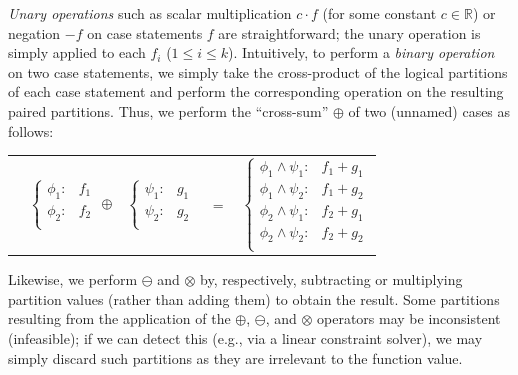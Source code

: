 \documentclass[letterpaper]{article}
\begin{document}
\emph{Unary operations} such as scalar multiplication $c\cdot f$ (for
some constant $c \in \mathbb{R}$) or negation $-f$ on case statements
$f$ are straightforward; the unary operation is simply applied to each
$f_i$ ($1 \leq i \leq k$). Intuitively, to perform a \emph{binary
  operation} on two case statements, we simply take the cross-product
of the logical partitions of each case statement and perform the
corresponding operation on the resulting paired partitions.  Thus, we 
perform the ``cross-sum'' $\oplus$ of two (unnamed) cases as follows:
{\footnotesize 
\begin{center}
\begin{tabular}{r c c c l}
&
\hspace{-6mm} 
  $\begin{cases}
    \phi_1: & f_1 \\ 
    \phi_2: & f_2 \\ 
  \end{cases}$
$\oplus$
&
\hspace{-4mm}
  $\begin{cases}
    \psi_1: & g_1 \\ 
    \psi_2: & g_2 \\ 
  \end{cases}$
&
\hspace{-2mm} 
$ = $
&
\hspace{-2mm}
  $\begin{cases}
  \phi_1 \wedge \psi_1: & f_1 + g_1 \\ 
  \phi_1 \wedge \psi_2: & f_1 + g_2 \\ 
  \phi_2 \wedge \psi_1: & f_2 + g_1 \\ 
  \phi_2 \wedge \psi_2: & f_2 + g_2 \\ 
  \end{cases}$
\end{tabular}
\end{center}
}
\normalsize
Likewise, we perform $\ominus$ and $\otimes$ by,
respectively, subtracting or multiplying partition values (rather than
adding them) to obtain the result.  
Some partitions resulting from
the application of the $\oplus$, $\ominus$, and $\otimes$ operators
may be inconsistent (infeasible); if we can detect this (e.g., via
a linear constraint solver), we may simply discard such 
partitions as they are irrelevant to the function value.
\end{document}
